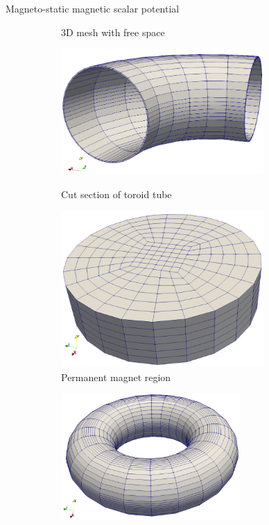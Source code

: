 \documentclass{beamer}
\begin{document}
\begin{frame}{Magneto-static magnetic scalar potential}
{\begin{figure}[h]
\begin{subfigure}[b]{0.39\textwidth}
\caption{3D mesh with free space}
\end{subfigure}
\begin{subfigure}[b]{0.29\textwidth}
\centering
\includegraphics[width=0.85\textwidth]{3d_mesh_3.png}
\caption{Cut section of toroid tube}
\includegraphics[width=0.85\textwidth]{3d_mesh_5.png}
\caption{Permanent magnet region}
\end{subfigure}
\begin{subfigure}[b]{0.29\textwidth}
\centering
\includegraphics[width=0.75\textwidth]{3d_mesh_4.png}

\end{subfigure}
\end{figure}}
\end{frame}
\end{document}
